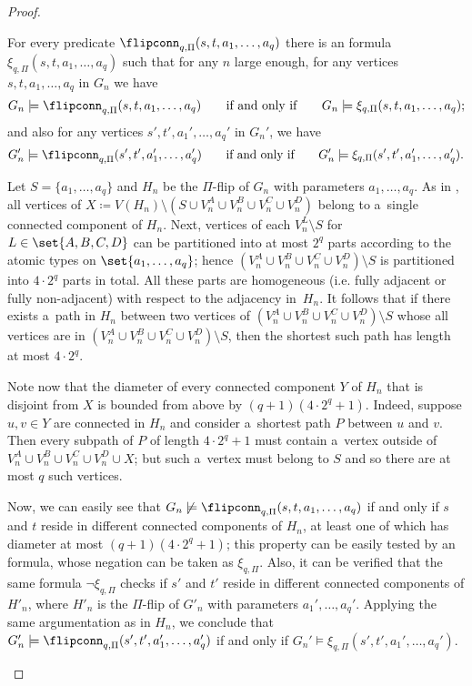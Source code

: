 \begin{proof}
    \begin{claim}
        \label{cl:flipconn-to-fo}
        For every predicate $\flipconn_{q, \Pi}(s, t, a_1, \ldots, a_q)$ there is an \fo formula $\xi_{q, \Pi}(s, t, a_1, \ldots, a_q)$ such that for any $n$ large enough, for any vertices $s, t, a_1, \ldots, a_q$ in $G_n$ we have
        \[
            G_n \models \flipconn_{q, \Pi}(s, t, a_1, \ldots, a_q)\qquad \textrm{if and only if}\qquad G_n \models \xi_{q, \Pi}(s, t, a_1, \ldots, a_q);
        \]
        and also for any vertices $s', t', a_1', \ldots, a_q'$ in $G_n'$, we have
        \[
            G_n' \models \flipconn_{q, \Pi}(s', t', a_1', \ldots, a_q')\qquad \textrm{if and only if}\qquad  G_n' \models \xi_{q, \Pi}(s', t', a_1', \ldots, a_q').
        \]
    \end{claim}
    \begin{claimproof}
        Let $S = \{a_1, \ldots, a_q\}$ and $H_n$ be the $\Pi$-flip of $G_n$ with parameters $a_1, \ldots, a_q$.
        As in , all vertices of $X \coloneqq V(H_n) \setminus \left(S \cup V_n^A \cup V_n^B \cup V_n^C \cup V_n^D\right)$ belong to a~single connected component of $H_n$.
        Next, vertices of each $V_n^L \setminus S$ for $L \in \set{A, B, C, D}$ can be partitioned into at most $2^q$ parts according to the atomic types on $\set{a_1, \ldots, a_q}$; hence $(V_n^A \cup V_n^B \cup V_n^C \cup V_n^D) \setminus S$ is partitioned into $4 \cdot 2^q$ parts in total.
        All these parts are homogeneous (i.e. fully adjacent or fully non-adjacent) with respect to the adjacency in~$H_n$.
        It follows that if there exists a~path in $H_n$ between two vertices of $(V_n^A \cup V_n^B \cup V_n^C \cup V_n^D) \setminus S$ whose all vertices are in $(V_n^A \cup V_n^B \cup V_n^C \cup V_n^D) \setminus S$, then the shortest such path has length at most $4 \cdot 2^q$.

        Note now that the diameter of every connected component $Y$ of $H_n$ that is disjoint from $X$ is bounded from above by $(q + 1)(4 \cdot 2^q + 1)$. Indeed, suppose $u, v \in Y$ are connected in $H_n$ and consider a~shortest path $P$ between $u$ and $v$.
        Then every subpath of $P$ of length $4 \cdot 2^q + 1$ must contain a~vertex outside of $V_n^A \cup V_n^B \cup V_n^C \cup V_n^D \cup X$; but such a~vertex must belong to $S$ and so there are at most $q$ such vertices.
        
        Now, we can easily see that $G_n \not\models \flipconn_{q, \Pi}(s, t, a_1, \ldots, a_q)$ if and only if $s$ and $t$ reside in different connected components of $H_n$, at least one of which has diameter at most $(q + 1)(4 \cdot 2^q + 1)$; this property can be easily tested by an \fo formula, whose negation can be taken as $\xi_{q, \Pi}$.
        Also, it can be verified that the same formula $\neg \xi_{q, \Pi}$ checks if $s'$ and $t'$ reside in different connected components of $H'_n$, where $H'_n$ is the $\Pi$-flip of $G'_n$ with parameters $a_1', \ldots, a_q'$.
        Applying the same argumentation as in $H_n$, we conclude that $G_n' \models \flipconn_{q, \Pi}(s', t', a_1', \ldots, a_q')$ if and only if $G_n' \models \xi_{q, \Pi}(s', t', a_1', \ldots, a_q')$.
    \end{claimproof}


\end{proof}
